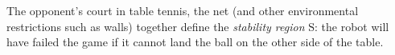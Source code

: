 \documentclass[10pt,a4paper]{article}
\newcommand{\boldvec}[1]{\boldsymbol{\mathrm{#1}}}
\let\vec\boldvec
\newcommand{\court}{\vec{S}} %
\begin{document}

The opponent's court in table tennis, the net (and other environmental restrictions such as walls) together define the \emph{stability region} $\court$: the robot will have failed the game if it cannot land the ball on the other side of the table.

\end{document}
